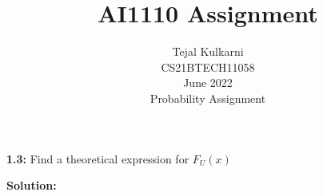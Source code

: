 \documentclass[journal,12pt,two column]{IEEEtran}
\title{AI1110 Assignment  }
\author{Tejal Kulkarni \\ CS21BTECH11058 \\\vspace*{20pt} June 2022 \\  Probability Assignment}
\newcommand*{\permcomb}[4][0mu]{{{}^{#3}\mkern#1#2_{#4}}}
\begin{document}
\maketitle

\newcommand{\solution}{\noindent \textbf{Solution: }}
\providecommand{\pr}[1]{\ensuremath{\Pr\left(#1\right)}}
\providecommand{\cdf}[2]{\ensuremath{\text{F}_{#1}\left(#2\right)}}
\providecommand{\qfunc}[1]{\ensuremath{Q\left(#1\right)}}
\providecommand{\sbrak}[1]{\ensuremath{{}\left[#1\right]}}
\providecommand{\lsbrak}[1]{\ensuremath{{}\left[#1\right.}}
\providecommand{\rsbrak}[1]{\ensuremath{{}\left.#1\right]}}
\providecommand{\brak}[1]{\ensuremath{\left(#1\right)}}
\providecommand{\lbrak}[1]{\ensuremath{\left(#1\right.}}
\providecommand{\rbrak}[1]{\ensuremath{\left.#1\right)}}
\providecommand{\cbrak}[1]{\ensuremath{\left\{#1\right\}}}
\providecommand{\lcbrak}[1]{\ensuremath{\left\{#1\right.}}
\newcommand*{\comb}[1][-1mu]{\permcomb[#1]{C}}
\renewcommand{\thetable}{\arabic{table}}
\providecommand{\rcbrak}[1]{\ensuremath{\left.#1\right\}}}
\newcommand{\myvec}[1]{\ensuremath{\begin{pmatrix}#1\end{pmatrix}}}
\newcommand{\mydet}[1]{\ensuremath{\begin{vmatrix}#1\end{vmatrix}}}
\let\vec\mathbf

\textbf{1.3:} Find a theoretical expression for $F_U(x)$

\solution
\end{document}
